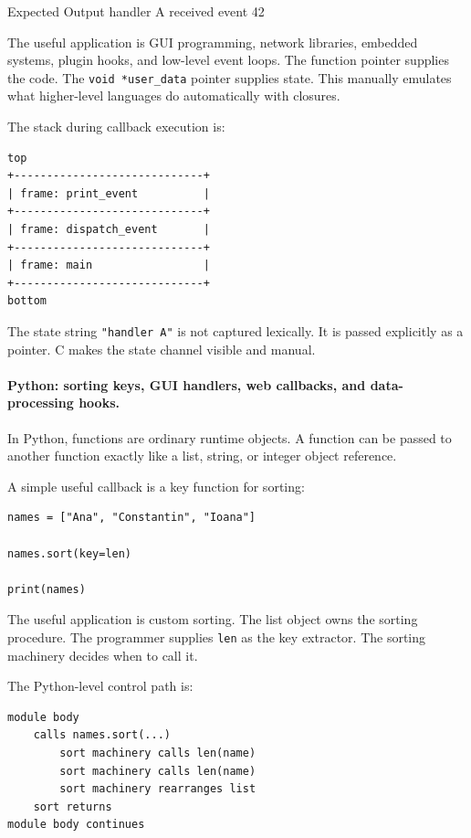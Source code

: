 \begin{iobox}{Expected Output}
handler A received event 42 \\
\end{iobox}



The useful application is GUI programming, network libraries, embedded systems, plugin hooks, and low-level event loops. The function pointer supplies the code. The \texttt{void *user\_data} pointer supplies state. This manually emulates what higher-level languages do automatically with closures.

The stack during callback execution is:

\begin{verbatim}
top
+-----------------------------+
| frame: print_event          |
+-----------------------------+
| frame: dispatch_event       |
+-----------------------------+
| frame: main                 |
+-----------------------------+
bottom
\end{verbatim}

The state string \texttt{"handler A"} is not captured lexically. It is passed explicitly as a pointer. C makes the state channel visible and manual.

\paragraph{Python: sorting keys, GUI handlers, web callbacks, and data-processing hooks.}

In Python, functions are ordinary runtime objects. A function can be passed to another function exactly like a list, string, or integer object reference.

A simple useful callback is a key function for sorting:

\begin{verbatim}
names = ["Ana", "Constantin", "Ioana"]

names.sort(key=len)

print(names)
\end{verbatim}

The useful application is custom sorting. The list object owns the sorting procedure. The programmer supplies \texttt{len} as the key extractor. The sorting machinery decides when to call it.

The Python-level control path is:

\begin{verbatim}
module body
    calls names.sort(...)
        sort machinery calls len(name)
        sort machinery calls len(name)
        sort machinery rearranges list
    sort returns
module body continues
\end{verbatim}

